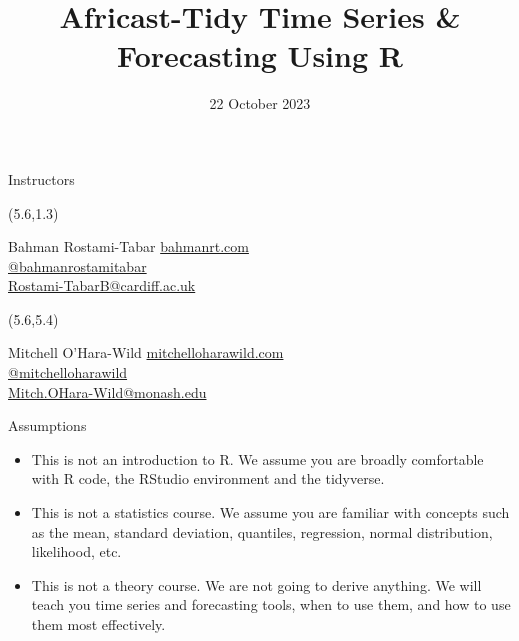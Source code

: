 \documentclass[
  14pt,
  ignorenonframetext,
  aspectratio=169,
]{beamer}
\title{Africast-Tidy Time Series \& Forecasting Using R}
\author{}
\date{22 October 2023}
\providecommand{\tightlist}{%
  \setlength{\itemsep}{0pt}\setlength{\parskip}{0pt}}\usepackage{longtable,booktabs,array}
\begin{document}
\frame{\titlepage}
\begin{frame}{Instructors}
\protect\hypertarget{instructors}{}
\begin{textblock}{8.2}(5.6,1.3)
\begin{alertblock}{Bahman Rostami-Tabar}
\href{https://www.bahmanrt.com/}{ bahmanrt.com}\\
\href{https://github.com/bahmanrostamitabar}{  @bahmanrostamitabar}\\
\href{mailto:Rostami-TabarB@cardiff.ac.uk}{  Rostami-TabarB@cardiff.ac.uk}
\end{alertblock}
\end{textblock}

\begin{textblock}{8.2}(5.6,5.4)
\begin{alertblock}{Mitchell O'Hara-Wild}
\href{https://mitchelloharawild.com}{ mitchelloharawild.com}\\
\href{https://github.com/mitchoharawild}{  @mitchelloharawild}\\
\href{mailto:Mitch.OHara-Wild@monash.edu}{  Mitch.OHara-Wild@monash.edu}
\end{alertblock}
\end{textblock}
\end{frame}

\begin{frame}{Assumptions}
\protect\hypertarget{assumptions}{}
\begin{itemize}
\tightlist
\item
  This is not an introduction to R. We assume you are broadly
  comfortable with R code, the RStudio environment and the tidyverse.
\item
  This is not a statistics course. We assume you are familiar with
  concepts such as the mean, standard deviation, quantiles, regression,
  normal distribution, likelihood, etc.
\item
  This is not a theory course. We are not going to derive anything. We
  will teach you time series and forecasting tools, when to use them,
  and how to use them most effectively.
\end{itemize}
\end{frame}
\end{document}
